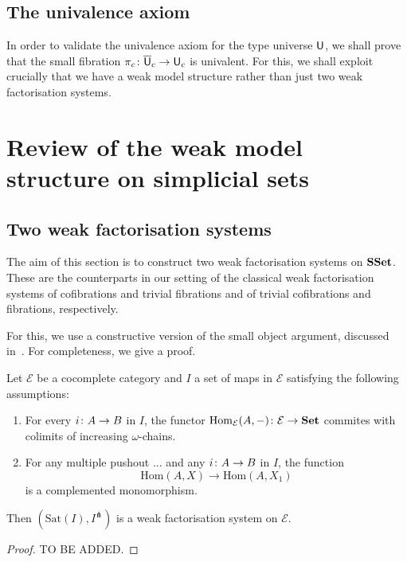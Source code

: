 \documentclass[reqno,10pt,a4paper,oneside,draft]{amsart}
\begin{document}
\subsection*{The univalence axiom} 

In order to validate the univalence axiom for the type universe $\mathsf{U}$, we shall prove that the small fibration 
$\pi_c \colon \overline{\mathsf{U}}_c \to \mathsf{U}_c$ is univalent. For this, we shall exploit crucially that we have a weak model
structure rather than just two weak factorisation systems.


\newpage



\section{Review of the weak model structure on simplicial sets} 

\subsection*{Two weak factorisation systems}

The aim of this section is to construct two weak factorisation systems on $\mathbf{SSet}$. These are the counterparts in our setting of the classical weak factorisation systems of cofibrations and trivial fibrations and of trivial cofibrations and fibrations, respectively. 

For this, we use a constructive version of the small object argument, discussed in~\cite{henry2018wms}. For completeness, we give a proof. 

\begin{lemma} \label{thm:soa} Let $\mathcal{E}$ be a cocomplete category and $I$ a set of maps in $\mathcal{E}$ satisfying the following assumptions:
\begin{enumerate}[$(i)$]
\item For every $i \colon A \to B$ in $I$, the functor $\mathrm{Hom}_\mathcal{E}(A, -) \colon \mathcal{E} \to
\mathbf{Set}$ commites with colimits of increasing $\omega$-chains.
\item For any multiple pushout ... and any $i \colon A \to B$ in $I$, the function
\[
\mathrm{Hom}(A, X) \to \mathrm{Hom}(A, X_1)
\]
is a complemented monomorphism.
\end{enumerate}
Then $(\mathrm{Sat}(I), I^\pitchfork)$ is a weak factorisation system on $\mathcal{E}$.
\end{lemma}

\begin{proof} TO BE ADDED.
\end{proof}
\end{document}
